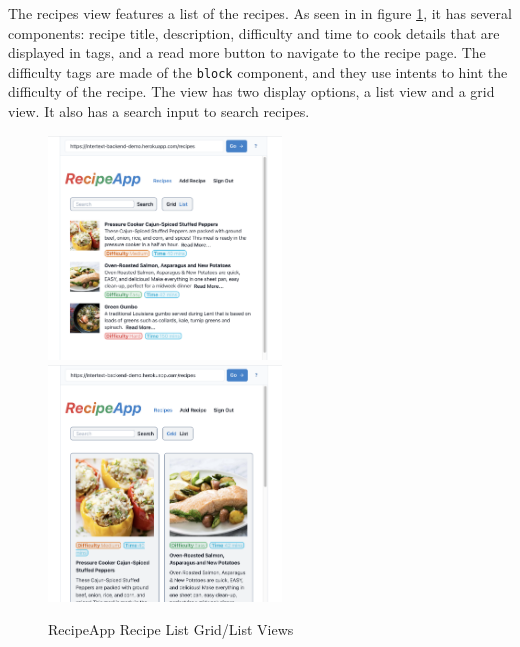 The recipes view features a list of the recipes. As seen in in figure \ref{fig:rec_recipe_list}, it has several components: recipe title, description, difficulty and time to cook details that are displayed in tags, and a read more button to navigate to the recipe page. The difficulty tags are made of the \texttt{block} component, and they use intents to hint the difficulty of the recipe. The view has two display options, a list view and a grid view. It also has a search input to search recipes.

\begin{figure}[htb]
  \centering
  \includegraphics[width=6.2cm]{thesis/paper/images/recipe_list.png}
  \,
  \includegraphics[width=6.2cm]{thesis/paper/images/recipe_grid.png}
  \caption{RecipeApp Recipe List Grid/List Views}%
  \label{fig:rec_recipe_list}%
\end{figure}

